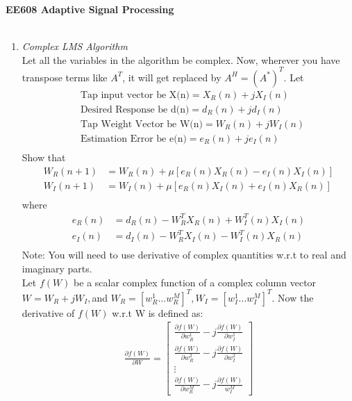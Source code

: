 \documentclass[journal,12pt,onecolumn]{IEEEtran}
\begin{document}
\centering \textbf{EE608  Adaptive Signal Processing}\\
\medskip
{}\\
\bigskip
\begin{enumerate}
\item \textit{Complex LMS Algorithm}\\
Let all the variables in the algorithm be complex. Now, wherever  you have transpose terms like $A^T$, it will get replaced by $A^H={(A^*)}^T$. Let\\
\begin{align*}
&\text{Tap input vector be X(n)}={X_R}(n)+j{X_I}(n)\\
&\text{Desired Response be d(n)}={d_R}(n)+jd_I(n)\\
&\text{Tap Weight Vector be W(n)}={W_R}(n)+j{W_I}(n)\\
&\text{Estimation Error be e(n)}=e_R(n)+j{e_I}(n)\\    
\end{align*}
\medskip
Show that
\begin{align*}
W_R(n+1)& ={W_R}(n)+\mu[e_R(n)X_R(n)-e_I(n)X_I(n)]\\
W_I(n+1)& =W_I(n)+\mu[e_R(n)X_I(n)+e_I(n)X_R(n)]\\
\end{align*}
where
\begin{align*}
e_R(n)& =d_R(n)-W_{R}^{T}{X_R(n)}+W_{I}^{T}(n)X_I(n)\\
e_I(n)& =d_I(n)-W_{R}^{T}{X_I(n)}-W_{I}^{T}(n){X_R(n)}\\
\end{align*}
\smallskip
Note: You will need to use derivative of complex quantities w.r.t to real and imaginary parts.\\
Let $f(W)$ be a scalar complex function of a complex column vector $W=W_R+jW{_I},$and $W_R=[w_{R}^{1}...w_{R}^{M}]^T,W_I=[w_{I}^{1}...w_{I}^{M}]^T.$ Now the derivative of $f(W)$ w.r.t W is defined as:
\bigskip
\begin{align*}
\frac{\partial{f(W)}}{\partial{W}}=\begin{bmatrix}{\frac{\partial{f(W)}}{\partial{w}_R^1}}-{j\frac{\partial{f(W)}}{\partial{w}_I^1}} \\[12pt]
{\frac{\partial{f(W)}}{\partial{w}_R^2}}-{j\frac{\partial{f(W)}}{\partial{w}_I^2}} \\
\vdots \\
{\frac{\partial{f(W)}}{\partial{w}_R^M}}-{j\frac{\partial{f(W)}}{{w}_I^M}}
\end{bmatrix}
\end{align*}

\end{enumerate}
\end{document}
